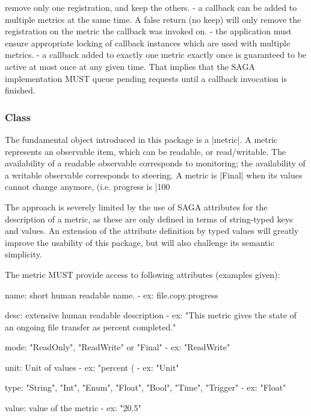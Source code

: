 \begin{myspec}
                  remove only one registration, and keep the 
                  others.
                - a callback can be added to multiple metrics at
                  the same time.  A false return (no keep) will
                  only remove the registration on the metric the
                  callback was invoked on.  
                - the application must ensure appropriate locking
                  of callback instances which are used with multiple
                  metrics.
                - a callback added to exactly one metric exactly
                  once is guaranteed to be active at most once at
                  any given time.  That implies that the SAGA
                  implementation MUST queue pending requests
                  until a callback invocation is finished.
 \end{myspec}
 
  \up
  \subsubsection*{Class }
 
    The fundamental object introduced in this package is a
    |metric|.  A metric represents an observable item, which can be
    readable, or read/writable.  The availability of a readable
    observable corresponds to monitoring; the availability of a
    writable observable corresponds to steering.  A metric is
    |Final| when its values cannot change anymore,  (i.e.
    progress is |100%
 
    The approach is severely limited by the use of SAGA
    attributes for the description of a metric, as these are
    only defined in terms of string-typed keys and values.  An
    extension of the attribute definition by typed values will
    greatly improve the usability of this package, but will also
    challenge its semantic simplicity.
 
    The metric MUST provide access to following attributes
    (examples given):
 
 \begin{myspectxt}
    name:      short human readable name.
                 - ex:  file.copy.progress
 
    desc:      extensive human readable description
                 - ex:  "This metric gives the state of
                         an ongoing file transfer as
                         percent completed."
 
    mode:      "ReadOnly", "ReadWrite" or "Final"
                 - ex:  "ReadWrite"
 
    unit:      Unit of values
                 - ex:  "percent (%
                 - ex:  "Unit"
 
    type:      "String", "Int", "Enum", "Float", "Bool", 
               "Time", "Trigger"
                 - ex:   "Float"
 
    value:     value of the metric
                 - ex:   "20.5"
 \end{myspectxt}
 
